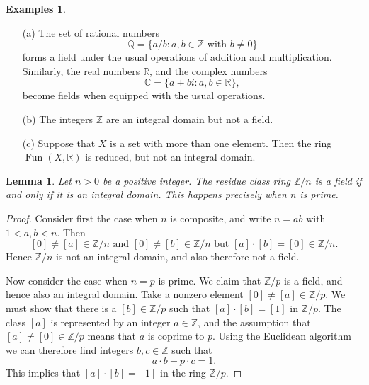\documentclass [12pt,oneside,a4paper,mathscr]{amsart}
\newtheorem{lemma}[thm]{Lemma}
\theoremstyle{definition}
\newtheorem{examples}[thm]{Examples}
\newcommand {\C}{\mathbb C}
\newcommand{\Q}{\mathbb{Q}}
\newcommand{\R}{\mathbb{R}}
\newcommand{\Z}{\mathbb Z}
\newcommand{\Fun}{\operatorname{Fun}}
\newcommand{\divides}{\mid}
\newcommand{\notdivides}{\nmid}
\begin{document}
\begin{examples}
\begin{itemize}
\item[(a)] The set of rational numbers \[\Q=\big\{a/b : a,b \in \Z\text{ with }b\neq 0 \big\}\] forms a field under the usual operations of addition and multiplication.
Similarly, the real numbers $\R$, and the complex numbers
\[\C=\{a+b i: a,b \in \R\},\] become  fields when equipped with the usual operations.
\smallskip
\item[(b)]  The integers $\Z$ are an integral domain but not a field.
\smallskip
\item[(c)] Suppose that $X$ is a set with more than one element. Then the ring $\Fun(X,\R)$ is reduced, but not an integral domain.
\end{itemize}
\end{examples}





\begin{lemma}
\label{pos}
Let $n>0$ be a positive integer. The residue class ring $\Z/n$ is a field if and only if it is an integral domain. This happens precisely when $n$ is prime.
\end{lemma}

\begin{proof}
Consider first the case when $n$ is composite, and write $n=ab$ with   $1<a,b<n$. Then \[[0]\neq [a]\in \Z/n\text{ and }[0]\neq [b]\in \Z/n\text{ but }[a]\cdot [b]=[0]\in \Z/n.\]
Hence  $\Z/n$ is not an integral domain, and also therefore not a field.

Now consider the case when $n=p$ is prime.   We claim that $\Z/p$ is a field, and hence also an integral domain. Take a nonzero element $[0]\neq [a]\in \Z/p$. We must show that there is a $[b]\in \Z/p$ such that  $[a]\cdot [b]=[1]$ in $\Z/p$. The class $[a]$ is represented by an integer $a\in \Z$, and the assumption that $[a]\neq [0]\in \Z/p$ means that $a$  is coprime to $p$.   Using the Euclidean algorithm  we can therefore find integers $b,c\in \Z$ such that
\[a\cdot b + p\cdot c = 1.\]
This implies that  $[a]\cdot [b]=[1]$ in the ring $\Z/p$.
\end{proof}
\end{document}
